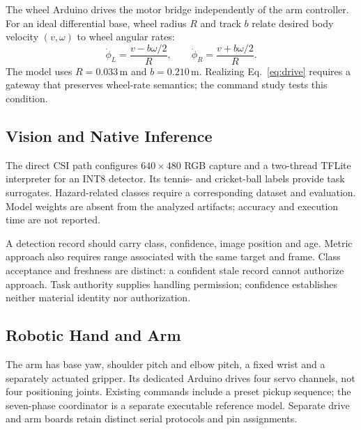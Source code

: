 The wheel Arduino drives the motor bridge independently of the arm controller. For an ideal differential base, wheel radius $R$ and track $b$ relate desired body velocity $(v,\omega)$ to wheel angular rates:
\begin{equation}
\dot\phi_L=\frac{v-b\omega/2}{R},\qquad
\dot\phi_R=\frac{v+b\omega/2}{R}.
\label{eq:drive}
\end{equation}
The model uses $R=0.033$\,m and $b=0.210$\,m. Realizing Eq.~\ref{eq:drive} requires a gateway that preserves wheel-rate semantics; the command study tests this condition.

\subsection{Vision and Native Inference}
The direct CSI path configures $640\times480$ RGB capture and a two-thread TFLite interpreter for an INT8 detector. Its tennis- and cricket-ball labels provide task surrogates. Hazard-related classes require a corresponding dataset and evaluation. Model weights are absent from the analyzed artifacts; accuracy and execution time are not reported.

A detection record should carry class, confidence, image position and age. Metric approach also requires range associated with the same target and frame. Class acceptance and freshness are distinct: a confident stale record cannot authorize approach. Task authority supplies handling permission; confidence establishes neither material identity nor authorization.

\subsection{Robotic Hand and Arm}
The arm has base yaw, shoulder pitch and elbow pitch, a fixed wrist and a separately actuated gripper. Its dedicated Arduino drives four servo channels, not four positioning joints. Existing commands include a preset pickup sequence; the seven-phase coordinator is a separate executable reference model. Separate drive and arm boards retain distinct serial protocols and pin assignments.

